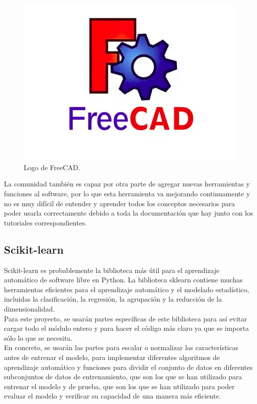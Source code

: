 \begin{figure}[H]
  \centering
  \includegraphics[scale=0.3]{figs/freecad} %
  \caption{Logo de FreeCAD.}
  \label{fig:freecad}
\end{figure}


La comunidad también es capaz por otra parte de agregar nuevas herramientas y funciones al software, por lo que esta herramienta va mejorando continuamente y no es muy difícil de entender y aprender todos los conceptos necesarios para poder usarla correctamente debido a toda la documentación que hay junto con los tutoriales correspondientes.


\subsection{Scikit-learn}
\label{subsec:sklearn}


Scikit-learn es probablemente la biblioteca más útil para el aprendizaje automático de software libre en Python. La biblioteca sklearn contiene muchas herramientas eficientes para el aprendizaje automático y el modelado estadístico, incluidas la clasificación, la regresión, la agrupación y la reducción de la dimensionalidad.\\ Para este proyecto, se usarán partes específicas de este biblioteca para así evitar cargar todo el módulo entero y para hacer el código más claro ya que se importa sólo lo que se necesita. \\

En concreto, se usarán las partes para escalar o normalizar las características antes de entrenar el modelo, para implementar diferentes algoritmos de aprendizaje automático y funciones para dividir el conjunto de datos en diferentes subconjuntos de datos de entrenamiento, que son los que se han utilizado para entrenar el modelo y de prueba, que son los que se han utilizado para poder evaluar el modelo y verificar su capacidad de una manera más eficiente.\\


